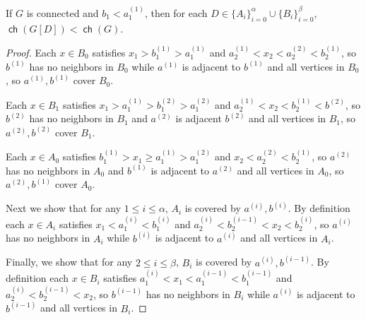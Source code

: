 \documentclass{theoretics}
\DeclareMathOperator\ch{\mathsf{ch}}
\begin{document}
\begin{proposition}
	\label{prop:permutation main chain}
	If $G$ is connected and $b_1 < a^{(1)}_1$, then
	for each $D \in \{A_i\}^{\alpha}_{i=0} \cup \{B_i\}_{i=0}^{\beta}$, $\ch(G[D]) < \ch(G)$.
\end{proposition}
\begin{proof}
	Each $x \in B_0$ satisfies $x_1 > b^{(1)}_1 > a^{(1)}_1$ and $a^{(1)}_2 < x_2 < a^{(2)}_2 <
	b^{(1)}_2$, so $b^{(1)}$ has no neighbors in $B_0$ while $a^{(1)}$ is adjacent to $b^{(1)}$ and all
	vertices in $B_0$, so $a^{(1)},b^{(1)}$ cover $B_0$.
	
	Each $x \in B_1$ satisfies $x_1 > a^{(1)}_1 > b^{(2)}_1 > a^{(2)}_1$ and $a^{(1)}_2 < x_2 <
	b^{(1)}_2 < b^{(2)}$, so $b^{(2)}$ has no neighbors in $B_1$ and $a^{(2)}$ is adjacent $b^{(2)}$ and
	all vertices in $B_1$, so $a^{(2)}, b^{(2)}$ cover $B_1$.
	
	Each $x \in A_0$ satisfies $b^{(1)}_1 > x_1 \geq a^{(1)}_1 > a^{(2)}_1$ and $x_2 < a^{(2)}_2 <
	b^{(1)}_2$, so $a^{(2)}$ has no neighbors in $A_0$ and $b^{(1)}$ is adjacent to $a^{(2)}$ and all
	vertices in $A_0$, so $a^{(2)}, b^{(1)}$ cover $A_0$.
	
	Next we show that for any $1 \leq i \leq \alpha$, $A_i$ is covered by $a^{(i)}, b^{(i)}$. By
	definition each $x \in A_i$ satisfies $x_1 < a^{(i)}_1 < b^{(i)}_1$ and $a^{(i)}_2 < b^{(i-1)}_2 <
	x_2 < b^{(i)}_2$, so $a^{(i)}$ has no neighbors in $A_i$ while $b^{(i)}$ is adjacent to $a^{(i)}$
	and all vertices in $A_i$.
	
	Finally, we show that for any $2 \leq i \leq \beta$, $B_i$ is covered by $a^{(i)}, b^{(i-1)}$. By
	definition each $x \in B_i$ satisfies $a^{(i)}_1 < x_1 < a^{(i-1)}_1 < b^{(i-1)}_1$ and $a^{(i)}_2 <
	b^{(i-1)}_2 < x_2$, so $b^{(i-1)}$ has no neighbors in $B_i$ while $a^{(i)}$ is adjacent
	to $b^{(i-1)}$ and all vertices in $B_i$.
\end{proof}
\end{document}
